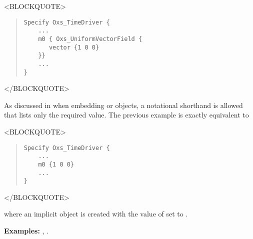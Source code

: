 \begin{description}
\begin{rawhtml}<BLOCKQUOTE>\end{rawhtml}
\begin{quote}
\begin{verbatim}
Specify Oxs_TimeDriver {
    ...
    m0 { Oxs_UniformVectorField {
       vector {1 0 0}
    }}
    ...
}
\end{verbatim}
\end{quote}
\begin{rawhtml}</BLOCKQUOTE>\end{rawhtml}
As discussed in
when embedding 
or 
objects, a notational shorthand is allowed that lists only the required
value.  The previous example is exactly equivalent to
\begin{rawhtml}<BLOCKQUOTE>\end{rawhtml}
\begin{quote}
\begin{verbatim}
Specify Oxs_TimeDriver {
    ...
    m0 {1 0 0}
    ...
}
\end{verbatim}
\end{quote}
\begin{rawhtml}</BLOCKQUOTE>\end{rawhtml}
where an implicit  object is
created with the value of  set to .

\textbf{Examples:} , .


\end{description}
